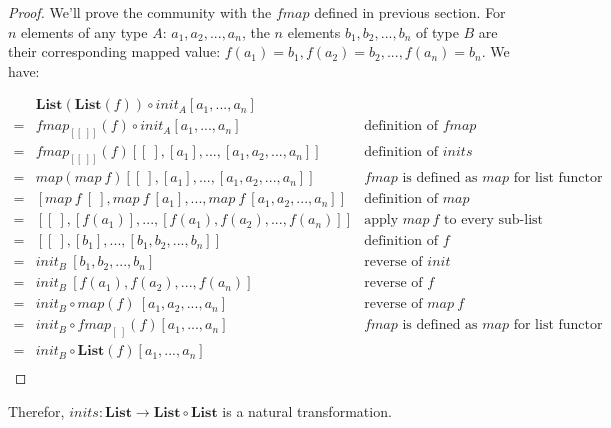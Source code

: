 \documentclass[b5paper]{article}
\begin{document}
\begin{example}
\begin{center}
\end{center}

\begin{proof}
We'll prove the community with the $fmap$ defined in previous section. For $n$ elements of any type $A$: $a_1, a_2, ..., a_n$, the $n$ elements $b_1, b_2, ..., b_n$ of type $B$ are their corresponding mapped value: $f(a_1) = b_1, f(a_2) = b_2, ..., f(a_n) = b_n$. We have:

\[
\begin{array}{cll}
  & \mathbf{List}(\mathbf{List}(f)) \circ init_A [a_1, ..., a_n] & \\
= & fmap_{[[\ ]]}(f) \circ init_A [a_1, ..., a_n] & \text{definition of $fmap$} \\
= & fmap_{[[\ ]]}(f) [[\ ], [a_1], ..., [a_1, a_2, ..., a_n]] & \text{definition of $inits$} \\
= & map(map\ f) [[\ ], [a_1], ..., [a_1, a_2, ..., a_n]] & \text{$fmap$ is defined as $map$ for list functor} \\
= & [map\ f\ [\ ], map\ f\ [a_1], ..., map\ f\ [a_1, a_2, ..., a_n]] & \text{definition of $map$} \\
= & [[\ ], [f(a_1)], ..., [f(a_1), f(a_2), ..., f(a_n)]] & \text{apply $map\ f$ to every sub-list} \\
= & [[\ ], [b_1], ..., [b_1, b_2, ..., b_n]] & \text{definition of $f$} \\
= & init_B\ [b_1, b_2, ..., b_n] & \text{reverse of $init$} \\
= & init_B\ [f(a_1), f(a_2), ..., f(a_n)] & \text{reverse of $f$} \\
= & init_B \circ map(f)\ [a_1, a_2, ..., a_n] & \text{reverse of $map\ f$} \\
= & init_B \circ fmap_{[\ ]}(f) [a_1, ..., a_n] & \text{$fmap$ is defined as $map$ for list functor} \\
= & init_B \circ \mathbf{List}(f) [a_1, ..., a_n] & \\
\end{array}
\]
\end{proof}

Therefor, $inits : \mathbf{List} \to \mathbf{List} \circ \mathbf{List}$ is a natural transformation.
\end{example}
\end{document}
